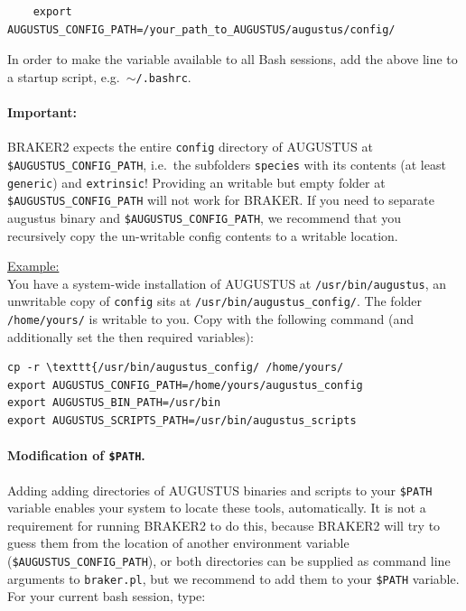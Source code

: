 \documentclass[a4paper,10pt]{report}
\begin{document}
    \begin{verbatim}
    export AUGUSTUS_CONFIG_PATH=/your_path_to_AUGUSTUS/augustus/config/
    \end{verbatim}

In order to make the variable available to all Bash sessions, add the above line to a startup script, e.g.~\texttt{$\sim$/.bashrc}.

\paragraph{Important: } BRAKER2 expects the entire \texttt{config} directory of AUGUSTUS at \texttt{\$AUGUSTUS\_CONFIG\_PATH}, i.e.~the subfolders \texttt{species} with its contents (at least \texttt{generic}) and \texttt{extrinsic}! Providing an writable but empty folder at \texttt{\$AUGUSTUS\_CONFIG\_PATH} will not work for BRAKER. If you need to separate augustus binary and \texttt{\$AUGUSTUS\_CONFIG\_PATH}, we recommend that you recursively copy the un-writable config contents to a writable location.

\noindent \underline{Example:}\\

You have a system-wide installation of AUGUSTUS at \texttt{/usr/bin/augustus}, an unwritable copy of \texttt{config} sits at \texttt{/usr/bin/augustus\_config/}. The folder \texttt{/home/yours/} is writable to you. Copy with the following command (and additionally set the then required variables):\\

\begin{verbatim}
cp -r \texttt{/usr/bin/augustus_config/ /home/yours/
export AUGUSTUS_CONFIG_PATH=/home/yours/augustus_config
export AUGUSTUS_BIN_PATH=/usr/bin
export AUGUSTUS_SCRIPTS_PATH=/usr/bin/augustus_scripts
\end{verbatim}


   
   \paragraph{Modification of \texttt{\$PATH}.} Adding adding directories of AUGUSTUS binaries and scripts to your \texttt{\$PATH} variable enables your system to locate these tools, automatically. It is not a requirement for running BRAKER2 to do this, because BRAKER2 will try to guess them from the location of another environment variable (\texttt{\$AUGUSTUS\_CONFIG\_PATH}), or both directories can be supplied as command line arguments to \texttt{braker.pl}, but we recommend to add them to your \texttt{\$PATH} variable. For your current bash session, type:
\end{document}
